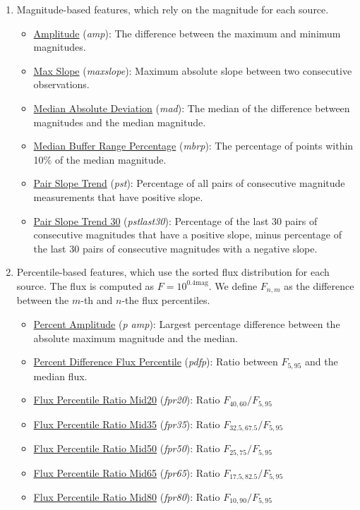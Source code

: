 \documentclass[a4paper,fleqn,usenatbib]{mnras}
\begin{document}
\begin{enumerate}
    \item Magnitude-based features, which rely on the magnitude for each source.
    \begin{itemize}
    \item \underline{Amplitude} (\textit{amp}): 
      The difference between the maximum and minimum magnitudes.
    \item \underline{Max Slope} (\textit{max\textunderscore slope}): 
      Maximum absolute slope between two consecutive observations.
    \item \underline{Median Absolute Deviation} (\textit{mad}): 
      The median of the difference between magnitudes and the median
      magnitude. 
    \item \underline{Median Buffer Range Percentage} (\textit{mbrp}): 
      The percentage of points within 10\% of the median magnitude.
    \item \underline{Pair Slope Trend} (\textit{pst}): 
      Percentage of all pairs of consecutive magnitude measurements that have positive slope.
    \item \underline{Pair Slope Trend 30} (\textit{pst\textunderscore last30}): 
      Percentage of the last 30 pairs of consecutive magnitudes that have a positive slope, minus percentage of the last 30 pairs of consecutive magnitudes with a negative slope.
    \end{itemize}


  \item Percentile-based features, which use the sorted flux distribution for
    each source. The flux is computed as $F = 10^{0.4 \mathrm{mag}}$. 
    We define $F_{n,m}$ as the difference between the $m$-th and $n$-the flux
    percentiles. 
    \begin{itemize}
    \item \underline{Percent Amplitude} (\textit{p \textunderscore amp}): 
      Largest percentage difference between the absolute maximum magnitude and the median.
    \item \underline{Percent Difference Flux Percentile} (\textit{pdfp}): 
      Ratio between $F_{5,95}$ and the median flux.
    \item \underline{Flux Percentile Ratio Mid20} (\textit{fpr20}): 
      Ratio $F_{40,60} / F_{5,95}$
    \item \underline{Flux Percentile Ratio Mid35} (\textit{fpr35}):
        Ratio $F_{32.5,67.5} / F_{5,95}$
      \item \underline{Flux Percentile Ratio Mid50} (\textit{fpr50}): 
        Ratio $F_{25,75} / F_{5,95}$
      \item \underline{Flux Percentile Ratio Mid65} (\textit{fpr65}): 
        Ratio $F_{17.5,82.5} / F_{5,95}$
      \item \underline{Flux Percentile Ratio Mid80} (\textit{fpr80}): 
        Ratio $F_{10,90} / F_{5,95}$
    \end{itemize}
    

\end{enumerate}
\end{document}
